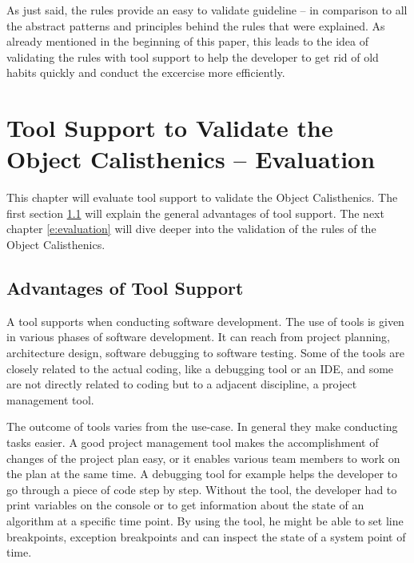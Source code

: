 As just said, the rules provide an easy to validate guideline -- in comparison to all the abstract patterns and principles behind the rules that were explained. As already mentioned in the beginning of this paper, this leads to the idea of validating the rules with tool support to help the developer to get rid of old habits quickly and conduct the excercise more efficiently. 





























\chapter{Tool Support to Validate the Object Calisthenics -- Evaluation}
\label{Evaluation}
This chapter will evaluate tool support to validate the Object Calisthenics. The first section \ref{e:advantages} will explain the general advantages of tool support. The next chapter \ref{e:evaluation} will dive deeper into the validation of the rules of the Object Calisthenics.

\section{Advantages of Tool Support}
\label{e:advantages}
A tool supports when conducting software development. The use of tools is given in various phases of software development. It can reach from project planning, architecture design, software debugging to software testing. Some of the tools are closely related to the actual coding, like a debugging tool or an \ac{IDE}, and some are not directly related to coding but to a adjacent discipline, a project management tool. 

The outcome of tools varies from the use-case. In general they make conducting tasks easier. A good project management tool makes the accomplishment of changes of the project plan easy, or it enables various team members to work on the plan at the same time. A debugging tool for example helps the developer to go through a piece of code step by step. Without the tool, the developer had to print variables on the console or to get information about the state of an algorithm at a specific time point. By using the tool, he might be able to set line breakpoints, exception breakpoints and can inspect the state of a system point of time. 

